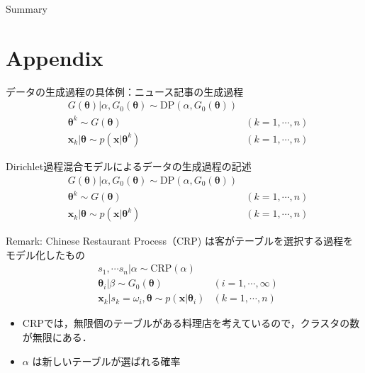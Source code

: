 \documentclass[10pt,fleqn]{beamer}
\begin{document}
	\begin{frame}{Summary}
		
	\end{frame}

	\appendix
	\section{Appendix}

    \begin{frame}{データの生成過程の具体例：ニュース記事の生成過程}
        \begin{align}
            &G(\bm \theta) | \alpha, G_0(\bm \theta) \sim \mathrm{DP}(\alpha, G_0(\bm \theta)) \tag{12.1}\\
            &\bm \theta^k  \sim G(\bm \theta) & (k = 1,\cdots,n) \tag{12.2}\\
            &\mathbf x_k|\bm\theta \sim p(\mathbf x|\bm \theta^k) & (k = 1,\cdots,n) \tag{12.3}
        \end{align}
    \end{frame}
    \begin{frame}{Dirichlet過程混合モデルによるデータの生成過程の記述}
        \begin{align}
            &G(\bm \theta) | \alpha, G_0(\bm \theta) \sim \mathrm{DP}(\alpha, G_0(\bm \theta)) \tag{12.1}\\
            &\bm \theta^k  \sim G(\bm \theta) & (k = 1,\cdots,n) \tag{12.2}\\
            &\mathbf x_k|\bm\theta \sim p(\mathbf x|\bm \theta^k) & (k = 1,\cdots,n) \tag{12.3}
        \end{align}
    \end{frame}
    \begin{frame}{Remark: Chinese Restaurant Process（CRP) は客がテーブルを選択する過程をモデル化したもの}
        \begin{align}
            &s_1,\cdots s_n| \alpha \sim \mathrm{CRP}(\alpha) \tag{12.4}\\
            &\bm \theta_i | \beta \sim G_0(\bm \theta) & (i = 1,\cdots,\infty) \tag{12.5}\\
            &\mathbf x_k|s_k = \omega_i,\bm\theta \sim p(\mathbf x|\bm \theta_i) & (k = 1,\cdots,n) \tag{12.6}
        \end{align}
        \begin{itemize}
            \item CRPでは，無限個のテーブルがある料理店を考えているので，クラスタの数が無限にある．
            \item $\alpha$ は新しいテーブルが選ばれる確率
        \end{itemize}
    \end{frame}
\end{document}
